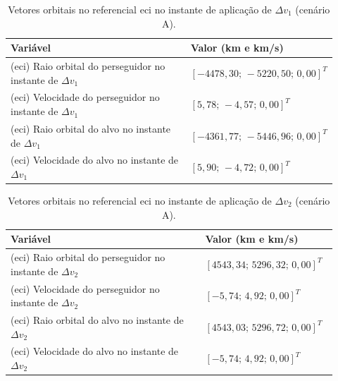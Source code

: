 \begin{table}[H]
\centering
\caption{Vetores orbitais no referencial \gls{eci} no instante de aplicação de $\Delta v_1$ (cenário A).}
\label{tab_cap4_eciA_dv1}
\begingroup
\small
\setlength{\tabcolsep}{4pt}
\renewcommand{\arraystretch}{1.15}
\begin{tabular}{|p{0.58\linewidth}|p{0.34\linewidth}|}
\hline
Variável & Valor (km e km/s)\\
\hline
(\gls{eci}) Raio orbital do perseguidor no instante de $\Delta v_1$ &
$\left[-4478,30;\,-5220,50;\,0,00\right]^T$\\
\hline
(\gls{eci}) Velocidade do perseguidor no instante de $\Delta v_1$ &
$\left[5,78;\,-4,57;\,0,00\right]^T$\\
\hline
(\gls{eci}) Raio orbital do alvo no instante de $\Delta v_1$ &
$\left[-4361,77;\,-5446,96;\,0,00\right]^T$\\
\hline
(\gls{eci}) Velocidade do alvo no instante de $\Delta v_1$ &
$\left[5,90;\,-4,72;\,0,00\right]^T$\\
\hline
\end{tabular}
\endgroup
\end{table}

\begin{table}[H]
\centering
\caption{Vetores orbitais no referencial \gls{eci} no instante de aplicação de $\Delta v_2$ (cenário A).}
\label{tab_cap4_eciA_dv2}
\begingroup
\small
\setlength{\tabcolsep}{4pt}
\renewcommand{\arraystretch}{1.15}
\begin{tabular}{|p{0.58\linewidth}|p{0.34\linewidth}|}
\hline
Variável & Valor (km e km/s)\\
\hline
(\gls{eci}) Raio orbital do perseguidor no instante de $\Delta v_2$ &
$\left[4543,34;\,5296,32;\,0,00\right]^T$\\
\hline
(\gls{eci}) Velocidade do perseguidor no instante de $\Delta v_2$ &
$\left[-5,74;\,4,92;\,0,00\right]^T$\\
\hline
(\gls{eci}) Raio orbital do alvo no instante de $\Delta v_2$ &
$\left[4543,03;\,5296,72;\,0,00\right]^T$\\
\hline
(\gls{eci}) Velocidade do alvo no instante de $\Delta v_2$ &
$\left[-5,74;\,4,92;\,0,00\right]^T$\\
\hline
\end{tabular}
\endgroup
\end{table}

